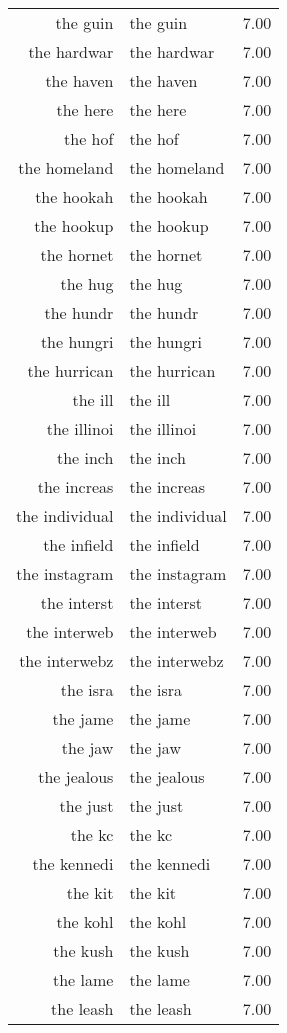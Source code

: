 \begin{table}[ht]
\begin{tabular}{rlr}
  the guin & the guin & 7.00 \\ 
  the hardwar & the hardwar & 7.00 \\ 
  the haven & the haven & 7.00 \\ 
  the here & the here & 7.00 \\ 
  the hof & the hof & 7.00 \\ 
  the homeland & the homeland & 7.00 \\ 
  the hookah & the hookah & 7.00 \\ 
  the hookup & the hookup & 7.00 \\ 
  the hornet & the hornet & 7.00 \\ 
  the hug & the hug & 7.00 \\ 
  the hundr & the hundr & 7.00 \\ 
  the hungri & the hungri & 7.00 \\ 
  the hurrican & the hurrican & 7.00 \\ 
  the ill & the ill & 7.00 \\ 
  the illinoi & the illinoi & 7.00 \\ 
  the inch & the inch & 7.00 \\ 
  the increas & the increas & 7.00 \\ 
  the individual & the individual & 7.00 \\ 
  the infield & the infield & 7.00 \\ 
  the instagram & the instagram & 7.00 \\ 
  the interst & the interst & 7.00 \\ 
  the interweb & the interweb & 7.00 \\ 
  the interwebz & the interwebz & 7.00 \\ 
  the isra & the isra & 7.00 \\ 
  the jame & the jame & 7.00 \\ 
  the jaw & the jaw & 7.00 \\ 
  the jealous & the jealous & 7.00 \\ 
  the just & the just & 7.00 \\ 
  the kc & the kc & 7.00 \\ 
  the kennedi & the kennedi & 7.00 \\ 
  the kit & the kit & 7.00 \\ 
  the kohl & the kohl & 7.00 \\ 
  the kush & the kush & 7.00 \\ 
  the lame & the lame & 7.00 \\ 
  the leash & the leash & 7.00 \\ 

\end{tabular}
\end{table}

